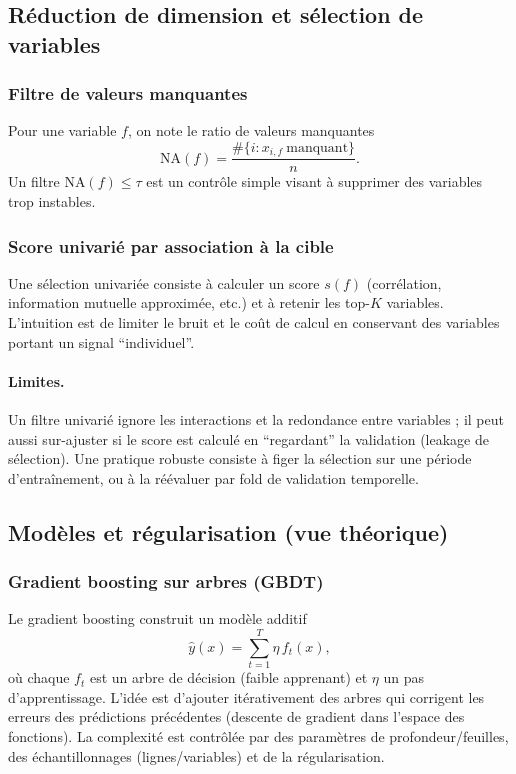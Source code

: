 \documentclass[11pt,a4paper]{article}
\newcommand{\1}{\mathbf{1}}
\begin{document}
\subsection{R\'eduction de dimension et s\'election de variables}

\subsubsection{Filtre de valeurs manquantes}
Pour une variable $f$, on note le ratio de valeurs manquantes
\[
\mathrm{NA}(f)=\frac{\#\{i: x_{i,f}\ \text{manquant}\}}{n}.
\]
Un filtre $\mathrm{NA}(f)\le \tau$ est un contr\^ole simple visant \`a supprimer des variables trop instables.

\subsubsection{Score univari\'e par association \`a la cible}
Une s\'election univari\'ee consiste \`a calculer un score $s(f)$ (corr\'elation, information mutuelle approxim\'ee, etc.) et \`a retenir les top-$K$
variables. L'intuition est de limiter le bruit et le co\^ut de calcul en conservant des variables portant un signal ``individuel''.

\paragraph{Limites.}
Un filtre univari\'e ignore les interactions et la redondance entre variables ; il peut aussi sur-ajuster si le score est calcul\'e en ``regardant''
la validation (leakage de s\'election). Une pratique robuste consiste \`a figer la s\'election sur une p\'eriode d'entra\^{i}nement, ou \`a la r\'e\'evaluer
par fold de validation temporelle.

\subsection{Mod\`eles et r\'egularisation (vue th\'eorique)}

\subsubsection{Gradient boosting sur arbres (GBDT)}
Le gradient boosting construit un mod\`ele additif
\[
\widehat y(x)=\sum_{t=1}^T \eta\, f_t(x),
\]
o\`u chaque $f_t$ est un arbre de d\'ecision (faible apprenant) et $\eta$ un pas d'apprentissage. L'id\'ee est d'ajouter it\'erativement des arbres
qui corrigent les erreurs des pr\'edictions pr\'ec\'edentes (descente de gradient dans l'espace des fonctions).
La complexit\'e est contr\^ol\'ee par des param\`etres de profondeur/feuilles, des \'echantillonnages (lignes/variables) et de la r\'egularisation.
\end{document}
